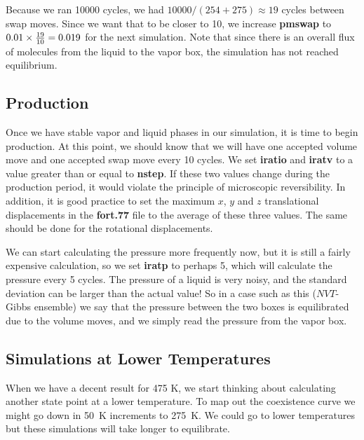 \documentclass[12pt,letterpaper]{article}
\begin{document}
{{{{{{\noindent Because we ran 10000 cycles, we had $10000 / (254 + 275)
\approx 19 $ cycles between swap moves.  Since we want that to be
closer to 10, we increase {\bf pmswap} to $0.01 \times {19 \over
10} = 0.019$ for the next simulation.  Note that since there is an
overall flux of molecules from the liquid to the vapor box, the
simulation has not reached equilibrium.

\subsection{Production}
\noindent Once we have stable vapor and liquid phases in our simulation,
it is time to begin production.  At this point, we
should know that we will have one accepted volume move and one accepted
swap move every 10 cycles.  We set {\bf iratio} and {\bf iratv} to a value greater than or equal to {\bf
nstep}.  If these two values change during the production period, it would
violate the principle of microscopic reversibility.  
In addition, it is good practice to set the maximum $x$, $y$ and $z$ translational
displacements in the {\bf fort.77} file to the average of these three values.  The same should
be done for the rotational displacements.

\noindent We can start calculating the pressure more frequently now,
but it is still a fairly expensive calculation, so we set {\bf iratp} to
perhaps 5, which will calculate the pressure every 5 cycles.  
The pressure of a liquid is very noisy, and the standard
deviation can be larger than the actual value!  
So in a case such as this ($NVT$-Gibbs ensemble) we say that the pressure between the two boxes
is equilibrated due to the volume moves, and we simply read the pressure from the vapor box.

\subsection{Simulations at Lower Temperatures}
\noindent When we have a decent result for 475 K, we start thinking about
calculating another state point at a lower temperature.  To map out
the coexistence curve we might go down in 50~K increments to 275~K.
We could go to lower temperatures but these simulations will take longer to equilibrate.  

}}}}}}
\end{document}
